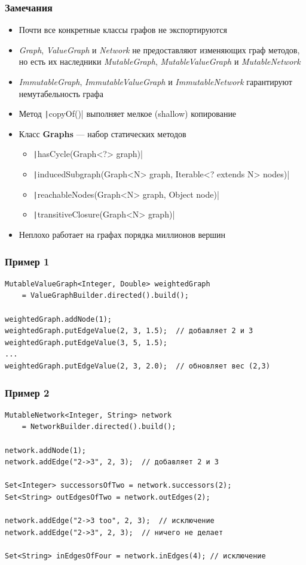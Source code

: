 \documentclass[xetex,mathserif,serif]{beamer}
\begin{document}
	\begin{frame}
		\frametitle{Замечания}
		\begin{itemize}
			\item Почти все конкретные классы графов не экспортируются
			\item \textit{Graph}, \textit{ValueGraph} и \textit{Network} не предоставляют изменяющих граф методов, но есть их наследники \textit{MutableGraph}, \textit{MutableValueGraph} и \textit{MutableNetwork}
			\item \textit{ImmutableGraph}, \textit{ImmutableValueGraph} и \textit{ImmutableNetwork} гарантируют немутабельность графа
			\item Метод \texttt|copyOf()| выполняет мелкое (shallow) копирование
			\item Класс \textbf{Graphs} --- набор статических методов
			\begin{itemize}
				\item \texttt|hasCycle(Graph<?> graph)|
				\item \texttt|inducedSubgraph(Graph<N> graph, Iterable<? extends N> nodes)|
				\item \texttt|reachableNodes(Graph<N> graph, Object node)|
				\item \texttt|transitiveClosure(Graph<N> graph)|
			\end{itemize}
			\item Неплохо работает на графах порядка миллионов вершин
		\end{itemize}
	\end{frame}

	\begin{frame}[fragile]
		\frametitle{Пример 1}
		\begin{verbatim}
MutableValueGraph<Integer, Double> weightedGraph 
    = ValueGraphBuilder.directed().build();

weightedGraph.addNode(1);
weightedGraph.putEdgeValue(2, 3, 1.5);  // добавляет 2 и 3
weightedGraph.putEdgeValue(3, 5, 1.5);  
...
weightedGraph.putEdgeValue(2, 3, 2.0);  // обновляет вес (2,3)
		\end{verbatim}
\end{frame}

	\begin{frame}[fragile]
		\frametitle{Пример 2}
		\begin{verbatim}
MutableNetwork<Integer, String> network 
    = NetworkBuilder.directed().build();

network.addNode(1);
network.addEdge("2->3", 2, 3);  // добавляет 2 и 3

Set<Integer> successorsOfTwo = network.successors(2);
Set<String> outEdgesOfTwo = network.outEdges(2);

network.addEdge("2->3 too", 2, 3);  // исключение
network.addEdge("2->3", 2, 3);  // ничего не делает

Set<String> inEdgesOfFour = network.inEdges(4); // исключение
		\end{verbatim}
\end{frame}
\end{document}
